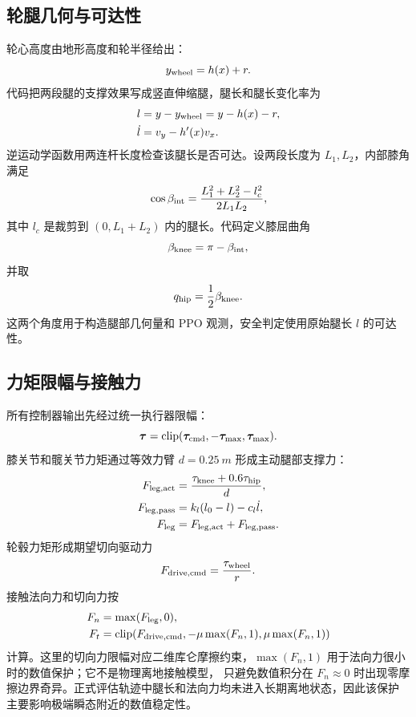 \documentclass[UTF8,12pt,a4paper,fontset=none]{ctexart}
\begin{document}
\subsection{轮腿几何与可达性}
轮心高度由地形高度和轮半径给出：
\begin{equation}
y_{\rm wheel}=h(x)+r.
\end{equation}
代码把两段腿的支撑效果写成竖直伸缩腿，腿长和腿长变化率为
\begin{align}
l&=y-y_{\rm wheel}=y-h(x)-r,\\
\dot l&=v_y-h'(x)v_x .
\end{align}
逆运动学函数用两连杆长度检查该腿长是否可达。设两段长度为 $L_1,L_2$，内部膝角满足
\begin{equation}
\cos\beta_{\rm int}=\frac{L_1^2+L_2^2-l_c^2}{2L_1L_2},
\end{equation}
其中 $l_c$ 是裁剪到 $(0,L_1+L_2)$ 内的腿长。代码定义膝屈曲角
\begin{equation}
\beta_{\rm knee}=\pi-\beta_{\rm int},
\end{equation}
并取
\begin{equation}
q_{\rm hip}=\frac12\beta_{\rm knee}.
\end{equation}
这两个角度用于构造腿部几何量和 PPO 观测，安全判定使用原始腿长 $l$ 的可达性。

\subsection{力矩限幅与接触力}
所有控制器输出先经过统一执行器限幅：
\begin{equation}
\bm\tau=\operatorname{clip}(\bm\tau_{\rm cmd},-\bm\tau_{\max},\bm\tau_{\max}).
\end{equation}
膝关节和髋关节力矩通过等效力臂 $d=\SI{0.25}{m}$ 形成主动腿部支撑力：
\begin{align}
F_{\rm leg,act}&=\frac{\tau_{\rm knee}+0.6\tau_{\rm hip}}{d},\\
F_{\rm leg,pass}&=k_l(l_0-l)-c_l\dot l,\\
F_{\rm leg}&=F_{\rm leg,act}+F_{\rm leg,pass}.
\end{align}
轮毂力矩形成期望切向驱动力
\begin{equation}
F_{\rm drive,cmd}=\frac{\tau_{\rm wheel}}{r}.
\end{equation}
接触法向力和切向力按
\begin{align}
F_n&=\max(F_{\rm leg},0),\\
F_t&=\operatorname{clip}\!\left(F_{\rm drive,cmd},-\mu\max(F_n,1),\mu\max(F_n,1)\right)
\end{align}
计算。这里的切向力限幅对应二维库仑摩擦约束，$\max(F_n,1)$ 用于法向力很小时的数值保护；它不是物理离地接触模型，
只避免数值积分在 $F_n\approx0$ 时出现零摩擦边界奇异。正式评估轨迹中腿长和法向力均未进入长期离地状态，因此该保护
主要影响极端瞬态附近的数值稳定性。
\end{document}
